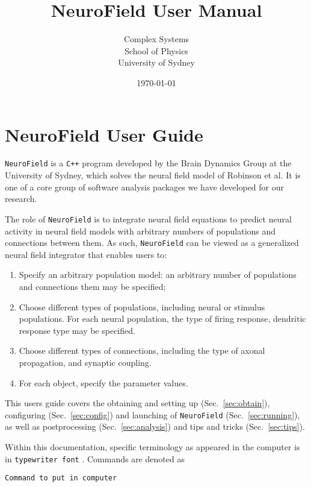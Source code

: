 \documentclass[12pt,a4paper]{article}
\title{NeuroField User Manual}
\author{Complex Systems\\School of Physics\\University of Sydney}
\date{\today}
\newcommand{\type}[1]{{\small\small\tt #1} }
\newcommand{\NF}[0]{\type{NeuroField}}
\newenvironment{worked_example}
{\begin{lrbox}{\mybox}\begin{minipage}{\textwidth}}
{\end{minipage}\end{lrbox}\fcolorbox{black}{skyblue}{\parbox{\textwidth}{{\bf Worked example}\\\\\usebox{\mybox}}}}
\begin{document}
\section*{NeuroField User Guide}

\NF is a \type{C++} program developed by the Brain Dynamics Group at the University of Sydney, which solves the neural field model of Robinson et al. It is one of a core group of software analysis packages we have developed for our research.

The role of \NF is to integrate neural field equations to predict neural activity in neural field models with arbitrary numbers of populations and connections between them. As such, \NF can be viewed as a generalized neural field integrator that enables users to:

\begin{enumerate}
    \item Specify an arbitrary population model: an arbitrary number of populations and connections them may be specified;
    \item Choose different types of populations, including neural or stimulus populations. For each neural population, the type of firing response, dendritic response type may be specified.
    \item Choose different types of connections, including the type of axonal propagation, and synaptic coupling.
    \item For each object, specify the parameter values.
\end{enumerate}

This users guide covers the obtaining and setting up (Sec.~\ref{sec:obtain}), configuring (Sec.~\ref{sec:config}) and launching of \NF (Sec.~\ref{sec:running}), as well as postprocessing (Sec.~\ref{sec:analysis}) and tips and tricks (Sec.~\ref{sec:tips}).

Within this documentation, specific terminology as appeared in the computer is in \type{typewriter font}. Commands are denoted as
\begin{lstlisting}
Command to put in computer
\end{lstlisting}

\end{document}
